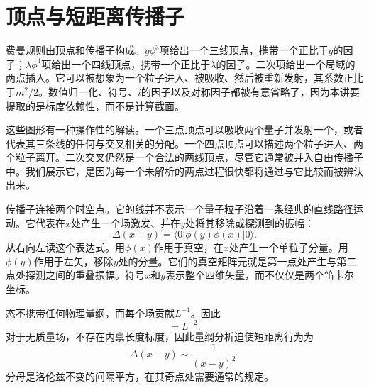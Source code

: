 \begin{classroomqa}
\end{classroomqa}

\section{顶点与短距离传播子}

费曼规则由顶点和传播子构成。\(g\phi^3\)项给出一个三线顶点，携带一个正比于\(g\)的因子；\(\lambda\phi^4\)项给出一个四线顶点，携带一个正比于\(\lambda\)的因子。二次项给出一个局域的两点插入。它可以被想象为一个粒子进入、被吸收、然后被重新发射，其系数正比于\(m^2/2\)。数值归一化、符号、\(i\)的因子以及对称因子都被有意省略了，因为本讲要提取的是标度依赖性，而不是计算截面。

这些图形有一种操作性的解读。一个三点顶点可以吸收两个量子并发射一个，或者代表其三条线的任何与交叉相关的分配。一个四点顶点可以描述两个粒子进入、两个粒子离开。二次交叉仍然是一个合法的两线顶点，尽管它通常被并入自由传播子中。我们展示它，是因为每一个未解析的两点过程很快都将通过与它比较而被辨认出来。

传播子连接两个时空点。它的线并不表示一个量子粒子沿着一条经典的直线路径运动。它代表在\(x\)处产生一个场激发、并在\(y\)处将其移除或探测到的振幅：
\begin{equation}
\Delta(x-y)=\langle0|\phi(y)\phi(x)|0\rangle.
\label{eq:position-propagator}
\end{equation}
从右向左读这个表达式。用\(\phi(x)\)作用于真空，在\(x\)处产生一个单粒子分量。用\(\phi(y)\)作用于左矢，移除\(y\)处的分量。它们的真空矩阵元就是第一点处产生与第二点处探测之间的重叠振幅。符号\(x\)和\(y\)表示整个四维矢量，而不仅仅是两个笛卡尔坐标。

态不携带任何物理量纲，而每个场贡献\(L^{-1}\)。因此
\begin{equation}
[\Delta]=L^{-2}.
\end{equation}
对于无质量场，不存在内禀长度标度，因此量纲分析迫使短距离行为为
\begin{equation}
\Delta(x-y)\sim\frac{1}{(x-y)^2}.
\label{eq:massless-propagator}
\end{equation}
分母是洛伦兹不变的间隔平方，在其奇点处需要通常的规定。

